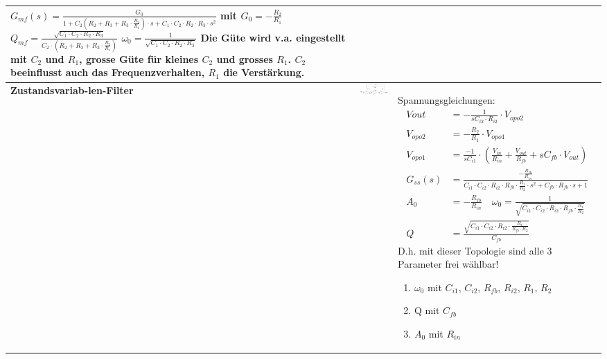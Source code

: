 \begin{longtable}{|>{\bfseries}p{3cm}|c|p{10cm}|}
{         $G_{mf}(s)	=\frac{G_0}{1+C_2(R_2+R_3+R_3\cdot \frac{R_2}{R_1})\cdot s+C_1\cdot C_2\cdot R_2\cdot R_3\cdot s^2}$ mit $ G_0 = -\frac{R_2}{R_1}$\newline
         $Q_{mf} =\frac{\sqrt{C_1\cdot C_2\cdot R_2\cdot R_3}}{C_2\cdot (R_2+R_3+R_3\cdot \frac{R_2}{R_1})}$ \qquad $\omega_0 = \frac{1}{\sqrt{C_1 \cdot C_2 \cdot R_2 \cdot R_3}}$\newline
         Die Güte wird v.a. eingestellt mit $C_2$ und $R_1$, grosse Güte für kleines $C_2$ und grosses $R_1$. $C_2$ beeinflusst auch das Frequenzverhalten, $R_1$ die Verstärkung.
        }
      \\ \hline
      {Zustandsvariab-len-Filter
      }
      & \includegraphics[width=8cm, valign=b,angle=270]{./pictures/zustandsvariable.png}
      & {Spannungsgleichungen:\newline
         \begin{align*}
             V{out}		&=-\frac{1}{s C_{i2}\cdot R_{i2}}\cdot V_{opo2}\\
             V_{opo2}	&=-\frac{R_2}{R_1}\cdot V_{opo1}\\
             V_{opo1}	&=\frac{-1}{s C_{i1}}\cdot \left(\frac{V_{in}}{R_{in}}+
             \frac{V_{out}}{R_{fb}}+s C_{fb}\cdot V_{out}\right)\\
             G_{ss}(s)	&=\frac{-\frac{R_{fb}}{R_{in}}}{C_{i1}\cdot C_{i2}\cdot R_{i2}\cdot
             R_{fb}\cdot \frac{R_1}{R_2}\cdot s^2+C_{fb}\cdot R_{fb}\cdot s+1}\\
             A_{0}		&=-\frac{R_{fb}}{R_{in}}\quad
             \omega_{0}	=\frac{1}{\sqrt{C_{i1}\cdot C_{i2}\cdot R_{i2}\cdot R_{fb}\cdot \frac{R_1}{R_2}}}\\
             Q			&=\frac{\sqrt{C_{i1}\cdot C_{i2}\cdot R_{i2}\cdot \frac{R_1}{R_{fb}\cdot R_2}}}{C_{fb}}
         \end{align*}
         D.h. mit dieser Topologie sind alle 3 Parameter frei wählbar!
         \begin{enumerate}
             \item $\omega_{0}$ mit $C_{i1}$, $C_{i2}$, $R_{fb}$, $R_{i2}$, $R_1$, $R_2$
             \item Q mit $C_{fb}$
             \item $A_0$ mit $R_{in}$
         \end{enumerate}
        }
      \\ \hline
\end{longtable}



